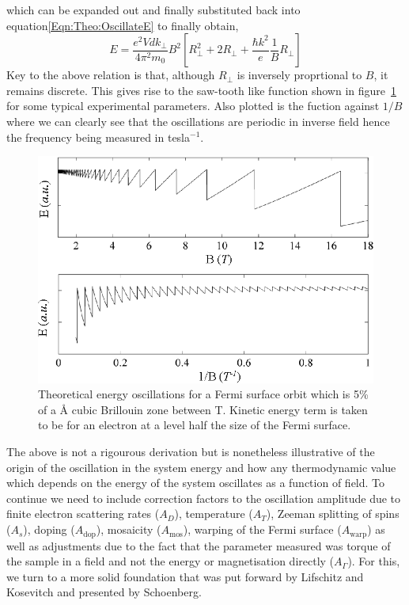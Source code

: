 which can be expanded out and finally substituted back into equation\ref{Eqn:Theo:OscillateE} to finally obtain,
\begin{equation}
\label{Eqn:Theo:OscIllustration}
E = \frac{e^2Vdk_\perp}{4\pi^2m_0}B^2\left[R_\perp^2 + 2R_\perp + \frac{\hbar k^2}{e}\frac{1}{B}R_\perp\right]
\end{equation}
Key to the above relation is that, although $R_\perp$ is inversely proprtional to $B$, it remains discrete. This gives rise to the saw-tooth like function shown in figure~\ref{Fig:Theo:EnergyOscillations} for some typical experimental parameters. Also plotted is the fuction against $1/B$ where we can clearly see that the oscillations are periodic in inverse field hence the frequency being measured in tesla$^{-1}$.
\begin{figure}[htbp]
    \begin{center}
        \includegraphics[scale=0.9]{Chapter-ExperimentalTechnique/Figures/TheoreticalOscillations/TheoreticalOscillations}
        \caption{Theoretical energy oscillations for a Fermi surface orbit which is 5\% of a \unit[5]{\AA} cubic Brillouin zone between \unit[1--18]{T}. Kinetic energy term is taken to be for an electron at a level half the size of the Fermi surface.}
        \label{Fig:Theo:EnergyOscillations}
    \end{center}
\end{figure}

The above is not a rigourous derivation but is nonetheless illustrative of the origin of the oscillation in the system energy and how any thermodynamic value which depends on the energy of the system oscillates as a function of field. To continue we need to include correction factors to the oscillation amplitude due to finite electron scattering rates ($A_D$), temperature ($A_T$), Zeeman splitting of spins ($A_s$), doping ($A_{\textrm{dop}}$), mosaicity ($A_{\textrm{mos}}$), warping of the Fermi surface ($A_{\textrm{warp}}$) as well as adjustments due to the fact that the parameter measured was torque of the sample in a field and not the energy or magnetisation directly ($A_{\Gamma}$). For this, we turn to a more solid foundation that was put forward by Lifschitz and Kosevitch and presented by Schoenberg.

